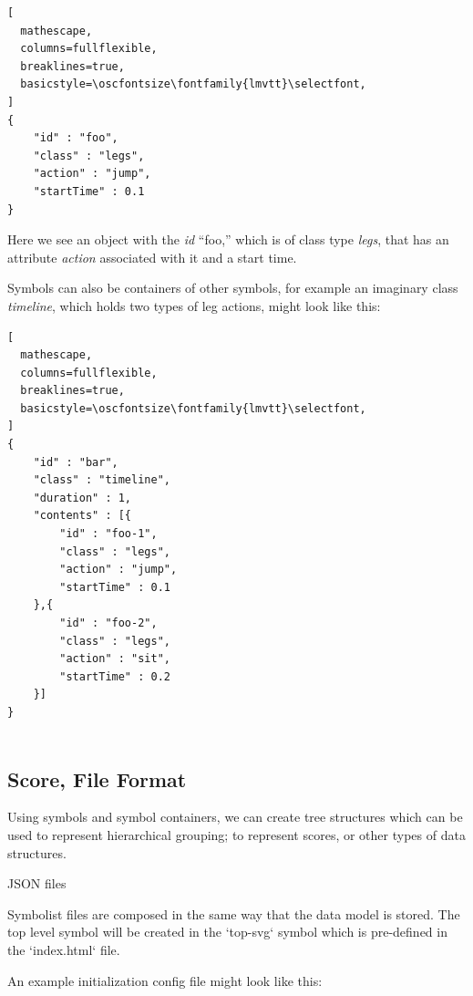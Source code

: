 \documentclass{article}
\def\oscfontsize{\footnotesize}
\begin{document}
\begin{lstlisting}[
  mathescape,
  columns=fullflexible,
  breaklines=true,
  basicstyle=\oscfontsize\fontfamily{lmvtt}\selectfont,
]
{
    "id" : "foo",
    "class" : "legs",
    "action" : "jump",
    "startTime" : 0.1
}
\end{lstlisting}

Here we see an object with the \textit{id} ``foo,'' which is of class type \textit{legs}, that has an attribute \textit{action} associated with it and a start time.

Symbols can also be containers of other symbols, for example an imaginary class \textit{timeline}, which holds two types of leg actions, might look like this:

\begin{lstlisting}[
  mathescape,
  columns=fullflexible,
  breaklines=true,
  basicstyle=\oscfontsize\fontfamily{lmvtt}\selectfont,
]
{
    "id" : "bar",
    "class" : "timeline",
    "duration" : 1,
    "contents" : [{
        "id" : "foo-1",
        "class" : "legs",
        "action" : "jump",
        "startTime" : 0.1
    },{
        "id" : "foo-2",
        "class" : "legs",
        "action" : "sit",
        "startTime" : 0.2
    }]
}


\end{lstlisting}

\subsection{Score, File Format}\label{subsec:file_format}

Using symbols and symbol containers, we can create tree structures which can be used to represent hierarchical grouping; to represent scores, or other types of data structures.

JSON files

Symbolist files are composed in the same way that the data model is stored. The top level symbol will be created in the `top-svg` symbol which is pre-defined in the `index.html` file.

An example initialization config file might look like this:
\end{document}
